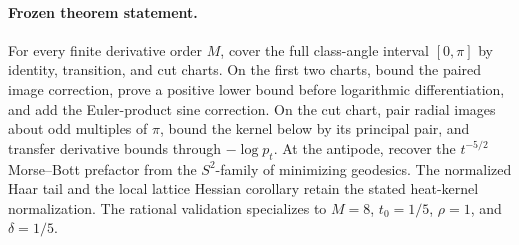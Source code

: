 \paragraph{Frozen theorem statement.}
For every finite derivative order $M$, cover the full class-angle interval
$[0,\pi]$ by identity, transition, and cut charts.  On the first two charts,
bound the paired image correction, prove a positive lower bound before
logarithmic differentiation, and add the Euler-product sine correction.  On
the cut chart, pair radial images about odd multiples of $\pi$, bound the
kernel below by its principal pair, and transfer derivative bounds through
$-\log p_t$.  At the antipode, recover the $t^{-5/2}$ Morse--Bott prefactor
from the $S^2$-family of minimizing geodesics.  The normalized Haar tail and
the local lattice Hessian corollary retain the stated heat-kernel
normalization.  The rational validation specializes to
$M=8$, $t_0=1/5$, $\rho=1$, and $\delta=1/5$.
